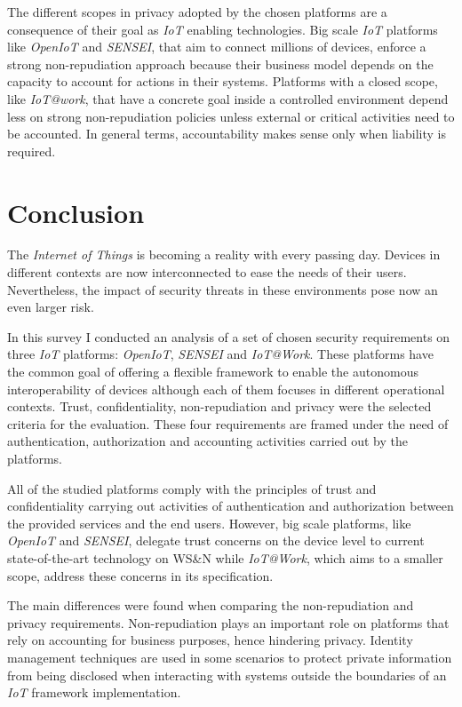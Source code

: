 \documentclass[journal]{IEEEtran}
\begin{document}
  The different scopes in privacy adopted by the chosen platforms are a consequence of their goal as \emph{IoT} enabling technologies. Big scale \emph{IoT} platforms like \emph{OpenIoT} and \emph{SENSEI}, that aim to connect millions of devices,  enforce a strong non-repudiation approach because their business model depends on the capacity to account for actions in their systems. Platforms with a closed scope, like \emph{IoT@work}, that have a concrete goal inside a controlled environment depend less on strong non-repudiation policies unless external or critical activities need to be accounted. In general terms, accountability makes sense only when liability is required.  

\section{Conclusion}
  The \emph{Internet of Things} is becoming a reality with every passing day. Devices in different contexts are now interconnected to ease the needs of their users. Nevertheless, the impact of security threats in these environments pose now an even larger risk.

  In this survey I conducted an analysis of a set of chosen security requirements on three \emph{IoT} platforms: \emph{OpenIoT}, \emph{SENSEI} and \emph{IoT@Work}. These platforms have the common goal of offering a flexible framework to enable the autonomous interoperability of devices although each of them focuses in different operational contexts. Trust, confidentiality, non-repudiation and privacy were the selected criteria for the evaluation. These four requirements are framed under the need of authentication, authorization and accounting activities carried out by the platforms.

  All of the studied platforms comply with the principles of trust and confidentiality carrying out activities of authentication and authorization between the provided services and the end users. However, big scale platforms, like \emph{OpenIoT} and \emph{SENSEI}, delegate trust concerns on the device level to current state-of-the-art technology on WS\&N while \emph{IoT@Work}, which aims to a smaller scope, address these concerns in its specification.

  The main differences were found when comparing the non-repudiation and privacy requirements. Non-repudiation plays an important role on platforms that rely on accounting for business purposes, hence hindering privacy. Identity management techniques are used in some scenarios to protect private information from being disclosed when interacting with systems outside the boundaries of an \emph{IoT} framework implementation.
\end{document}
